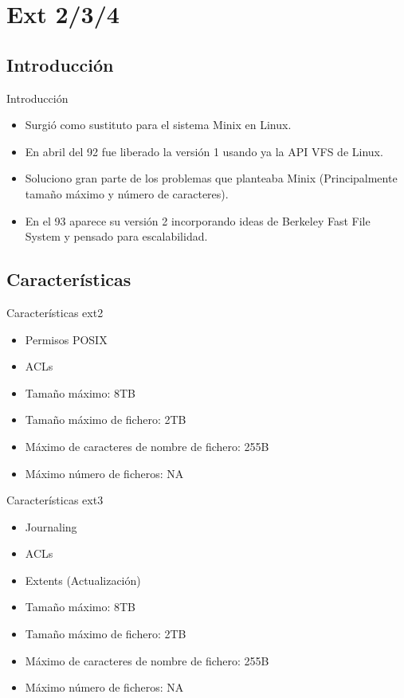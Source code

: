 \section{Ext 2/3/4}
\subsection{Introducción}
\begin{frame}{Introducción}
  \begin{itemize}
    \item Surgió como sustituto para el sistema Minix en Linux.
    \item En abril del 92 fue liberado la versión 1 usando ya la API VFS de Linux.
    \item Soluciono gran parte de los problemas que planteaba Minix (Principalmente tamaño máximo y número de caracteres).
    \item En el 93 aparece su versión 2 incorporando ideas de Berkeley Fast File System y pensado para escalabilidad.
  \end{itemize}
\end{frame}

\subsection{Características}
\begin{frame}{Características ext2}
  \begin{itemize}
    \item Permisos POSIX
    \item ACLs
    \item Tamaño máximo: 8TB
    \item Tamaño máximo de fichero: 2TB
    \item Máximo de caracteres de nombre de fichero: 255B
    \item Máximo número de ficheros: NA
  \end{itemize}
\end{frame}

\begin{frame}{Características ext3}
  \begin{itemize}
    \item Journaling
    \item ACLs
    \item Extents (Actualización)
    \item Tamaño máximo: 8TB
    \item Tamaño máximo de fichero: 2TB
    \item Máximo de caracteres de nombre de fichero: 255B
    \item Máximo número de ficheros: NA
  \end{itemize}
\end{frame}

